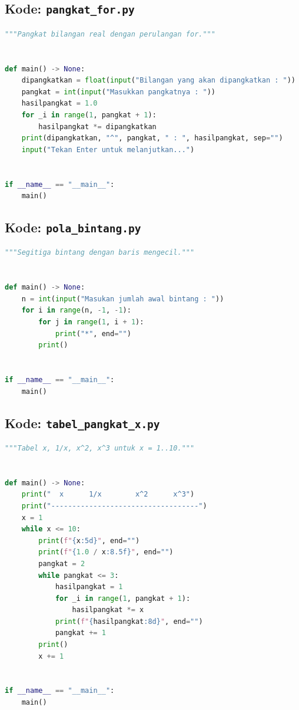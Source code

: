 ﻿\documentclass[../main.tex]{subfiles}
\begin{document}
\subsection{Kode: \texttt{pangkat\_for.py}}
\begin{lstlisting}[language=Python,caption={\texttt{pangkat\_for.py}}]
"""Pangkat bilangan real dengan perulangan for."""


def main() -> None:
    dipangkatkan = float(input("Bilangan yang akan dipangkatkan : "))
    pangkat = int(input("Masukkan pangkatnya : "))
    hasilpangkat = 1.0
    for _i in range(1, pangkat + 1):
        hasilpangkat *= dipangkatkan
    print(dipangkatkan, "^", pangkat, " : ", hasilpangkat, sep="")
    input("Tekan Enter untuk melanjutkan...")


if __name__ == "__main__":
    main()
\end{lstlisting}

\subsection{Kode: \texttt{pola\_bintang.py}}
\begin{lstlisting}[language=Python,caption={\texttt{pola\_bintang.py}}]
"""Segitiga bintang dengan baris mengecil."""


def main() -> None:
    n = int(input("Masukan jumlah awal bintang : "))
    for i in range(n, -1, -1):
        for j in range(1, i + 1):
            print("*", end="")
        print()


if __name__ == "__main__":
    main()
\end{lstlisting}

\subsection{Kode: \texttt{tabel\_pangkat\_x.py}}
\begin{lstlisting}[language=Python,caption={\texttt{tabel\_pangkat\_x.py}}]
"""Tabel x, 1/x, x^2, x^3 untuk x = 1..10."""


def main() -> None:
    print("  x      1/x        x^2      x^3")
    print("-----------------------------------")
    x = 1
    while x <= 10:
        print(f"{x:5d}", end="")
        print(f"{1.0 / x:8.5f}", end="")
        pangkat = 2
        while pangkat <= 3:
            hasilpangkat = 1
            for _i in range(1, pangkat + 1):
                hasilpangkat *= x
            print(f"{hasilpangkat:8d}", end="")
            pangkat += 1
        print()
        x += 1


if __name__ == "__main__":
    main()
\end{lstlisting}
\end{document}
